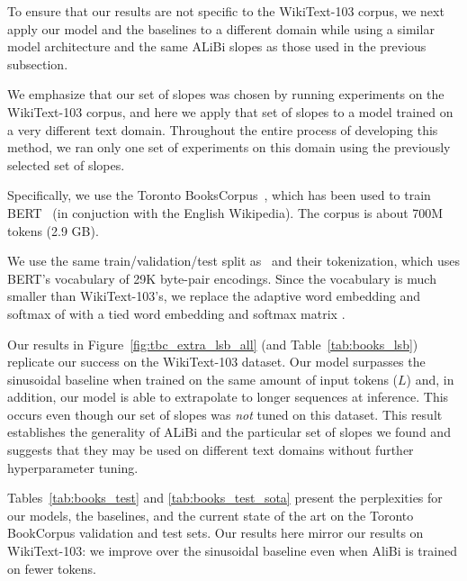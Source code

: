 To ensure that our results are not specific to the WikiText-103 corpus, we next apply our model and the baselines to a different domain while using a similar model architecture and the same ALiBi slopes as those used in the previous subsection.

We emphasize that our set of slopes was chosen by running experiments on the WikiText-103 corpus, and here we apply that set of slopes to a model trained on a very different text domain. Throughout the entire process of developing this method, we ran only one set of experiments on this domain using the previously selected set of slopes. %


Specifically, we use the Toronto BooksCorpus~\citep{zhu2015aligning}, which has been used to train BERT~\citep{bert} (in conjuction with the English Wikipedia). The corpus is about 700M tokens (2.9 GB).

We use the same train/validation/test split as~\citet{khandelwal20generalization} and their tokenization, which uses BERT's vocabulary of 29K byte-pair encodings.
Since the vocabulary is much smaller than WikiText-103's, we replace the adaptive word embedding and softmax of \citet{baevski} with a tied word embedding and softmax matrix \citep{tying,inan2017}.





Our results in Figure~\ref{fig:tbc_extra_lsb_all} (and Table~\ref{tab:books_lsb})  replicate our success on the WikiText-103 dataset. Our model surpasses the sinusoidal baseline when trained on the same amount of input tokens ($L$) and, in addition, our model is able to extrapolate to longer sequences at inference. This occurs even though our set of slopes was \emph{not} tuned on this dataset. %
This result establishes the generality of ALiBi and the particular set of slopes we found and suggests that they may be used on different text domains without further hyperparameter tuning.

Tables~\ref{tab:books_test} and \ref{tab:books_test_sota} present the perplexities for our \al models, the baselines, and the current state of the art on the Toronto BookCorpus validation and test sets. Our results here mirror our results on WikiText-103: we improve over the sinusoidal baseline even when AliBi is trained on fewer tokens. %
 